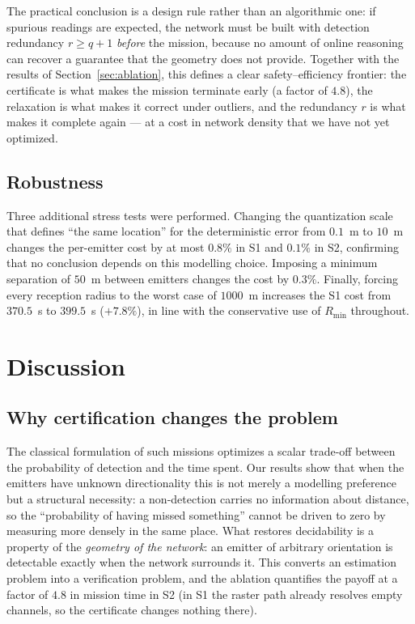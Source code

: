 \documentclass[journal,10pt]{IEEEtran}
\theoremstyle{definition}
\newcommand{\Rmin}{R_{\min}}
\begin{document}
The practical conclusion is a design rule rather than an algorithmic one: if spurious readings
are expected, the network must be built with detection redundancy $r\ge q+1$ \emph{before} the
mission, because no amount of online reasoning can recover a guarantee that the geometry does not
provide. Together with the results of Section~\ref{sec:ablation}, this defines a clear
safety--efficiency frontier: the certificate is what makes the mission terminate early (a factor of
$4.8$), the relaxation is what makes it correct under outliers, and the redundancy $r$ is what
makes it complete again --- at a cost in network density that we have not yet optimized.

\subsection{Robustness}
Three additional stress tests were performed. Changing the quantization scale that defines
``the same location'' for the deterministic error from $0.1$~m to $10$~m changes the per-emitter
cost by at most $0.8\%$ in S1 and $0.1\%$ in S2, confirming that no conclusion depends on this
modelling choice. Imposing a minimum separation of $50$~m between emitters changes the cost by
$0.3\%$. Finally, forcing every reception radius to the worst case of $1000$~m increases the S1
cost from $370.5$~s to $399.5$~s ($+7.8\%$), in line with the conservative use of $\Rmin$
throughout.

\section{Discussion}
\label{sec:discussion}

\subsection{Why certification changes the problem}
The classical formulation of such missions optimizes a scalar trade-off between the probability of
detection and the time spent. Our results show that when the emitters have unknown directionality this is not merely a modelling preference but a structural necessity: a non-detection
carries no information about distance, so the ``probability of having missed something'' cannot be
driven to zero by measuring more densely in the same place. What restores decidability is a
property of the \emph{geometry of the network}: an emitter of arbitrary orientation is detectable
exactly when the network surrounds it. This converts an estimation problem into a verification
problem, and the ablation quantifies the payoff at a factor of $4.8$ in mission time in S2
(in S1 the raster path already resolves empty channels, so the certificate changes nothing there).
\end{document}

